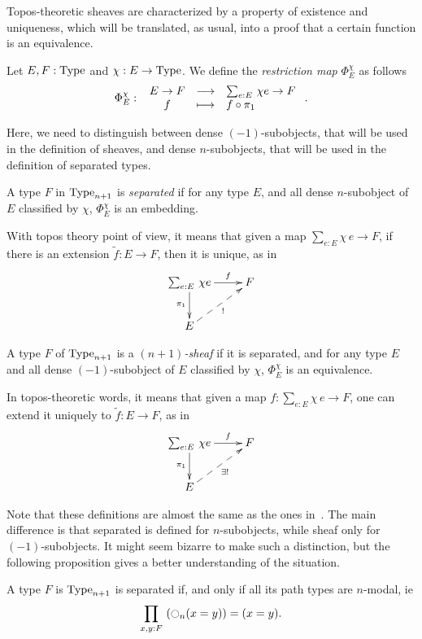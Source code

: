 Topos-theoretic sheaves are characterized by a property of existence
and uniqueness, which will be translated, as usual, into a proof that
a certain function is an equivalence.

\begin{defi}[Restriction]
  Let $E,F:\operatorname{Type}$ and $\chi:E\to\operatorname{Type}$. We define the {\em
    restriction map} $\Phi_E^\chi$ as follows
  \[
    \Phi_E^\chi \, \colon \left. \begin{array}{ccl} E\to F & \longrightarrow & \sum_{e:E}\, \chi e \to F \\ f & \longmapsto & f\circ \pi_1 \end{array} \right..
  \]
\end{defi}

Here, we need to distinguish between
dense $(-1)$-subobjects, that will be used in the definition of
sheaves, and dense $n$-subobjects, that will be used in the definition
of separated types. 

\begin{defi}
  A type $F$ in $\operatorname{Type}_{n+1}$ is {\em separated} if for any type $E$, and
  all dense $n$-subobject of $E$ classified by $\chi$,
  $\Phi_E^\chi$ is an embedding.
\end{defi}

With topos theory point of view, it means that given a map $\sum_{e:E}
\chi\, e \to F$,
if there is an extension $\tilde f:E\to F$, then it is unique, as in
 \[ \xymatrix{
    \sumD e E {\chi e} \ar[r]^-f \ar[d]_{\pi_1} & F \\
    E \ar@{-->}[ru]_{!}&
  }\]
\begin{defi}[Sheaf]
  A type $F$ of $\operatorname{Type}_{n+1}$ is a {\em $(n+1)$-sheaf} if it is
  separated, and for any type $E$ and all dense $(-1)$-subobject of
  $E$ classified by $\chi$, $\Phi_E^\chi$ is an
  equivalence.
\end{defi}

In topos-theoretic words, it means that given a map $f : \sum_{e:E}
\chi\, e\to F$, one can
extend it uniquely to $\tilde f:E \to F$, as in 
 \[ \xymatrix{
    \sumD e E {\chi e} \ar[r]^-f \ar[d]_{\pi_1} & F \\
    E \ar@{-->}[ru]_{\exists !}&
  }\]

Note that these definitions are almost the same as the ones
in~\cite{maclanemoerdijk}. The main difference is that {separated}
is defined for $n$-subobjects, while {sheaf} only for
$(-1)$-subobjects. It might seem bizarre to make such a distinction,
but the following proposition gives a better understanding of the situation.
\begin{prop}
  A type $F$ is $\operatorname{Type}_{n+1}$ is separated if, and only if all its
  path types are $n$-modal, ie
  \[ \prod_{x,y:F}\, \left( \ocircle_n(x=y) \right) = (x=y).\]
\end{prop}

